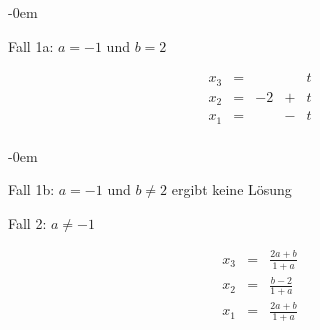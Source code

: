 \begin{enumerate}
						\abovedisplayskip-0em
						
						Fall 1a: \emph{$a = -1$} und \emph{$b = 2$} 
						
						\[
							\begin{array} {ccccc}
								x_3 & = & & & t\\
								x_2 & = & -2 & + & t\\
								x_1 & = & & - & t\\
							\end{array}
						\]
						
						\abovedisplayskip-0em
						
						Fall 1b: \emph{$a = -1$} und \emph{$b \neq 2$} ergibt keine L\"osung
						
						Fall 2: \emph{$a \neq -1$}
						
						\[
							\begin{array} {ccccc}
								x_3 & = & \frac{2a+b}{1+a}\\
								x_2 & = & \frac{b-2}{1+a}\\
								x_1 & = & \frac{2a+b}{1+a}\\
							\end{array}
						\]
						
				\end{enumerate}